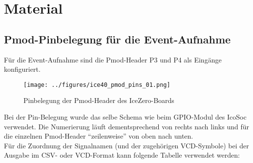 \chapter{Material}
\label{ch:Material}
\enlargethispage{120cm}
\section{Pmod-Pinbelegung für die Event-Aufnahme}
\label{sec:pmod_pins}
Für die Event-Aufnahme sind die Pmod-Header P3 und P4 als Eingänge konfiguriert.

\begin{figure}[h]
	\centering
	\captionsetup{justification=centering,margin=2cm}
		\texttt{[image: ../figures/ice40\_pmod\_pins\_01.png]}
		\caption[Pinbelegung der Pmod-Header des IceZero-Boards]{Pinbelegung der Pmod-Header des IceZero-Boards}
	\label{fig:ice40_pmod_pins}
\end{figure}

Bei der Pin-Belegung wurde das selbe Schema wie beim GPIO-Modul des IcoSoc verwendet. Die Numerierung läuft dementsprechend von rechts nach links und für die einzelnen Pmod-Header ``zeilenweise'' von oben nach unten.\\
Für die Zuordnung der Signalnamen (und der zugehörigen VCD-Symbole) bei der Ausgabe im CSV- oder VCD-Format kann folgende Tabelle verwendet werden:

